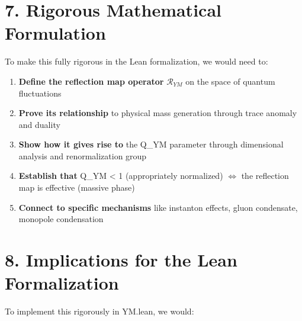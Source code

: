\documentclass[11pt]{article}
\begin{document}
\section{7. Rigorous Mathematical Formulation}

To make this fully rigorous in the Lean formalization, we would need to:

\begin{enumerate}
\item \textbf{Define the reflection map operator} $\mathcal{R}_{YM}$ on the space of quantum fluctuations
\item \textbf{Prove its relationship} to physical mass generation through trace anomaly and duality
\item \textbf{Show how it gives rise to} the Q_YM parameter through dimensional analysis and renormalization group
\item \textbf{Establish that} Q_YM < 1 (appropriately normalized) $\Leftrightarrow$ the reflection map is effective (massive phase)
\item \textbf{Connect to specific mechanisms} like instanton effects, gluon condensate, monopole condensation
\end{enumerate}

\section{8. Implications for the Lean Formalization}

To implement this rigorously in YM.lean, we would:
\end{document}
